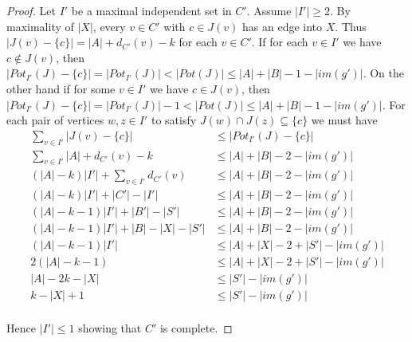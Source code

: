 \documentclass[12pt]{article}
\theoremstyle{plain}
\theoremstyle{definition}
\theoremstyle{remark}
\begin{document}
\begin{proof}
Let $I'$ be a maximal independent set in $C'$.  Assume $|I'| \geq 2$.  By maximality of $|X|$, every $v \in C'$ with $c \in J(v)$ has an edge into $X$.  
Thus $|J(v) - \{c\}| = |A| + d_{C'}(v) - k$ for each $v \in C'$.
If for each $v \in I'$ we have $c \not \in J(v)$, then $|Pot_{I'}(J) - \{c\}| = |Pot_{I'}(J)| < |Pot(J)| \leq |A| + |B| - 1 - |im(g')|$.  On the other hand if for some $v \in I'$ we have $c \in J(v)$, then $|Pot_{I'}(J) - \{c\}| = |Pot_{I'}(J)| - 1 < |Pot(J)| \leq |A| + |B| - 1 - |im(g')|$.  For each pair of vertices $w, z \in I'$ to satisfy $J(w) \cap J(z) \subseteq \{c\}$ we must have
\begin{align*}
 \sum_{v \in I'} |J(v) - \{c\}| &\leq |Pot_{I'}(J) - \{c\}| \\
 \sum_{v \in I'} |A| + d_{C'}(v) - k &\leq |A| + |B| - 2 - |im(g')| \\
 (|A|- k)|I'| + \sum_{v \in I'} d_{C'}(v) &\leq |A| + |B| - 2 - |im(g')| \\
 (|A|- k)|I'| + |C'| - |I'| &\leq |A| + |B| - 2 - |im(g')| \\
 (|A| - k - 1)|I'| + |B'| - |S'|&\leq |A| + |B| - 2 - |im(g')| \\
 (|A| - k - 1)|I'| + |B| - |X| - |S'|&\leq |A| + |B| - 2 - |im(g')| \\
 (|A| - k - 1)|I'| &\leq |A| + |X| - 2 + |S'| - |im(g')| \\
 2(|A| - k - 1) &\leq |A| + |X| - 2 + |S'| - |im(g')| \\
 |A| - 2k - |X| &\leq |S'| - |im(g')| \\
 k - |X| + 1 &\leq |S'| - |im(g')| \\
\end{align*}

Hence $|I'| \leq 1$ showing that $C'$ is complete.
\end{proof}
\end{document}
